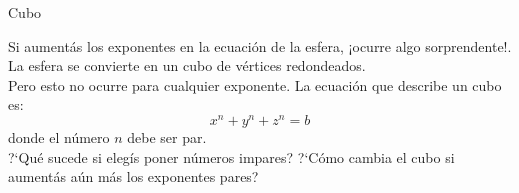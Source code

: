 \documentclass[es]{SurferDesc}%
\begin{document}
\footnotesize
%

\begin{surferPage}
  \begin{surferTitle}Cubo\end{surferTitle}
   \begin{surferText}
   
Si aument{\'a}s los exponentes en la ecuaci{\'o}n de la esfera, ¡ocurre algo sorprendente!. La esfera se convierte en un cubo de v{\'e}rtices redondeados.\\
\vspace{0.3cm}
Pero esto no ocurre para cualquier exponente. La ecuaci{\'o}n que describe un cubo es:
\[x^n+y^n+z^n=b\]
donde el n{\'u}mero $n$ debe ser par.\\
\vspace{0.3cm}
?`Qu{\'e} sucede si eleg{\'i}s poner n{\'u}meros impares? ?`C{\'o}mo cambia el cubo si aument{\'a}s a{\'u}n m{\'a}s los exponentes pares?
     \end{surferText}
\end{surferPage}
\end{document}
